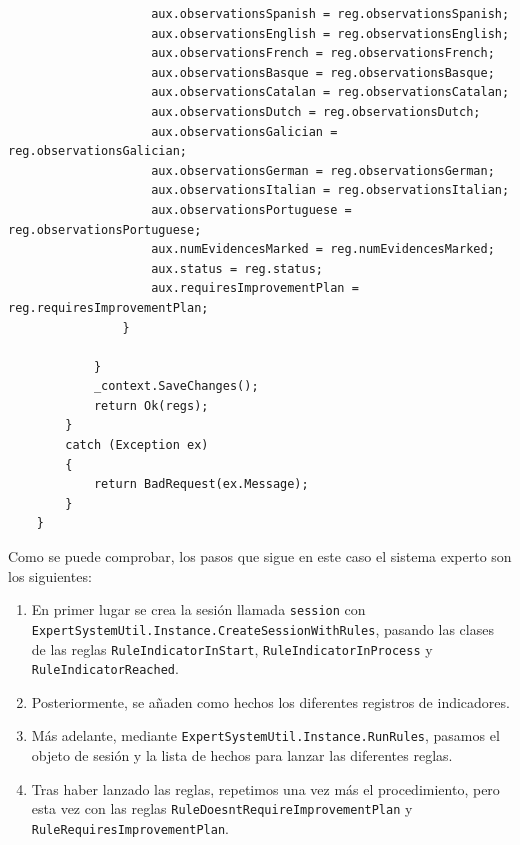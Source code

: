 \begin{lstlisting}
                    aux.observationsSpanish = reg.observationsSpanish;
                    aux.observationsEnglish = reg.observationsEnglish;
                    aux.observationsFrench = reg.observationsFrench;
                    aux.observationsBasque = reg.observationsBasque;
                    aux.observationsCatalan = reg.observationsCatalan;
                    aux.observationsDutch = reg.observationsDutch;
                    aux.observationsGalician = reg.observationsGalician;
                    aux.observationsGerman = reg.observationsGerman;
                    aux.observationsItalian = reg.observationsItalian;
                    aux.observationsPortuguese = reg.observationsPortuguese;
                    aux.numEvidencesMarked = reg.numEvidencesMarked;
                    aux.status = reg.status;
                    aux.requiresImprovementPlan = reg.requiresImprovementPlan;
                }
                
            }
            _context.SaveChanges();
            return Ok(regs);
        }
        catch (Exception ex)
        {
            return BadRequest(ex.Message);
        }
    }
\end{lstlisting}
Como se puede comprobar, los pasos que sigue en este caso el sistema experto son los siguientes:
\begin{enumerate}
    \item En primer lugar se crea la sesión llamada \texttt{session} con \texttt{ExpertSystemUtil.Instance.CreateSessionWithRules}, pasando las clases de las reglas \texttt{RuleIndicatorInStart}, \texttt{RuleIndicatorInProcess} y \texttt{RuleIndicatorReached}.
    \item Posteriormente, se añaden como hechos los diferentes registros de indicadores.
    \item Más adelante, mediante \texttt{ExpertSystemUtil.Instance.RunRules},
    pasamos el objeto de sesión y la lista de hechos para lanzar las diferentes
    reglas.
    \item Tras haber lanzado las reglas, repetimos una vez más el procedimiento, pero esta vez con las reglas \texttt{RuleDoesntRequireImprovementPlan} y \texttt{RuleRequiresImprovementPlan}.
\end{enumerate}
